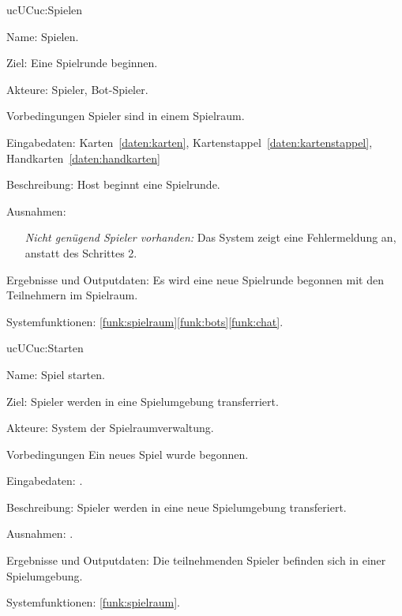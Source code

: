 \begin{description}[leftmargin=5em, style=sameline]
	\begin{lhp}{uc}{UC}{uc:Spielen}
		\item [Name:] Spielen.
		\item [Ziel:] Eine Spielrunde beginnen.
		\item [Akteure:] Spieler, Bot-Spieler.
		\item [Vorbedingungen] Spieler sind in einem Spielraum.
		\item [Eingabedaten:] Karten~\ref{daten:karten}, Kartenstappel~\ref{daten:kartenstappel}, Handkarten~\ref{daten:handkarten} 
		\item [Beschreibung:] Host beginnt eine Spielrunde.
		\item [Ausnahmen:] \hfill
			\begin{itemize} 
				\item[] \textit{Nicht genügend Spieler vorhanden:} Das System zeigt eine Fehlermeldung an, anstatt des Schrittes 2.
				
			\end{itemize}
		\item [Ergebnisse und Outputdaten:] Es wird eine neue Spielrunde begonnen mit den Teilnehmern im Spielraum.	
		\item [Systemfunktionen:] \ref{funk:spielraum}\ref{funk:bots}\ref{funk:chat}.
	\end{lhp}
	
	\begin{lhp}{uc}{UC}{uc:Starten}
		\item [Name:] Spiel starten.
		\item [Ziel:] Spieler werden in eine Spielumgebung transferriert.
		\item [Akteure:] System der Spielraumverwaltung.
		\item [Vorbedingungen] Ein neues Spiel wurde begonnen.
		\item [Eingabedaten:] .
		\item [Beschreibung:] Spieler werden in eine neue Spielumgebung transferiert.
		\item [Ausnahmen:] .
		\item [Ergebnisse und Outputdaten:] Die teilnehmenden Spieler befinden sich in einer Spielumgebung.
		\item [Systemfunktionen:] \ref{funk:spielraum}.
	\end{lhp}
	

\end{description}
